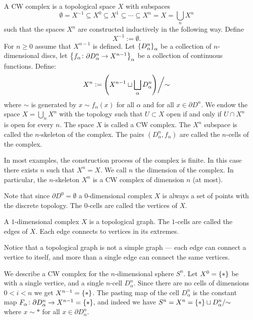 \documentclass[11pt,a4paper]{article}
\begin{document}
\begin{definition}[CW complex]
  A CW complex is a topological space $X$ with subspaces
  \[
    \emptyset= X^{-1} \subseteq X^{0} \subseteq X^{1} \subseteq \cdots
    \subseteq X^n = X = \bigcup_{n} X^{n}
  \]
  such that the spaces $X^n$ are constructed inductively in the following
  way. Define
  \[
    X^{-1} := \emptyset.
  \]
  For $n \geq 0$ assume that $X^{n-1}$ is defined.
  Let $\left\{D^n_{\alpha}\right\}_{\alpha}$ be a collection of $n$-dimensional discs,
  let $\left\{f_{\alpha} \colon \partial D^n_{\alpha} \to X^{n-1}\right\}_{\alpha}$
  be a collection of continuous functions. Define:
  \[
    X^{n} := 
    \del{X^{n-1} \sqcup \bigsqcup_{\alpha} D^n_{\alpha}} \biggr/ {\sim}
  \]
  where $\sim$ is generated by $x \sim f_{\alpha}(x)$ for all $\alpha$ and
  for all $x \in \partial D^n$.
  We endow the space $X = \bigcup_n X^n$ with the topology such that 
  $U \subset X$ open if and only if $U \cap X^n$ is open for every $n$.
  The space $X$ is called a CW complex. The $X^n$ subspace is called the
  $n$-skeleton of the complex.
  The pairs $(D^n_{\alpha}, f_{\alpha})$ are called the $n$-cells of
  the complex.
\end{definition}

\begin{remark}
  In most examples, the construction process of the complex is finite.
  In this case there exists $n$ such that $X^n = X$.
  We call $n$ the dimension of the complex.
  In particular, the $n$-skeleton $X^n$ is a CW complex of dimension $n$
  (at most).
\end{remark}

\begin{example}
  Note that since $\partial D^0 = \emptyset$ a $0$-dimensional complex $X$ 
  is always a set of points with the discrete topology.
  The $0$-cells are called the vertices of $X$.
\end{example}

\begin{example}
  A $1$-dimensional complex $X$ is a topological graph.
  The $1$-cells are called the edges of $X$.
  Each edge connects to vertices in its extremes.
  \begin{remark}
    Notice that a topological graph is not a simple graph --- each edge
    can connect a vertice to itself, and more than a single edge can
    connect the same vertices.
  \end{remark}
\end{example}

\begin{example}
  We describe a CW complex for the $n$-dimensional sphere $S^n$.
  Let $X^{0} = \left\{*\right\}$ be with a single vertice, and a single $n$-cell
  $D^n_{\alpha}$.
  Since there are no cells of dimensions $0 < i < n$ we get $X^{n-1} = \left\{*\right\}$.
  The pasting map of the cell $D^n_{\alpha}$ is the constant map
  $F_{\alpha} \colon \partial D^n_{\alpha} \to X^{n-1} = \left\{*\right\}$,
  and indeed we have $S^n = X^n = {\left\{*\right\} \sqcup D^n_{\alpha}} / {\sim}$
  where $x \sim *$ for all $x \in \partial D^n_{\alpha}$.
\end{example}
\end{document}
